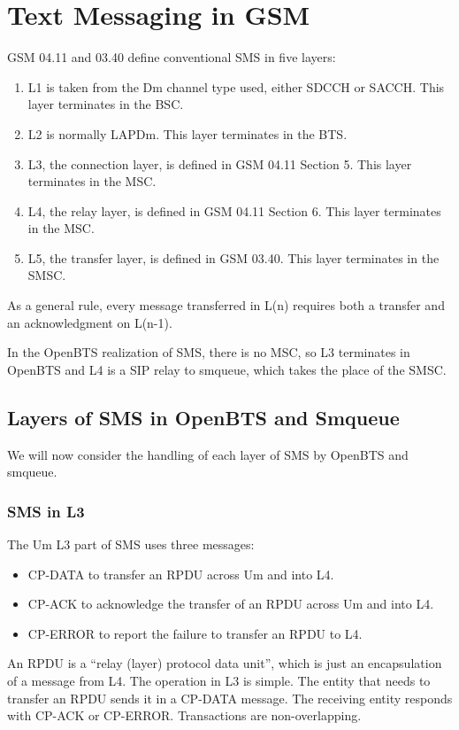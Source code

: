 \documentclass[11pt,openany]{book}
\begin{document}
\section{Text Messaging in GSM}
GSM 04.11 and 03.40 define conventional SMS in five layers:
\begin{enumerate}
	\item L1 is taken from the Dm channel type used, either SDCCH or SACCH. This layer terminates in the BSC.
	\item L2 is normally LAPDm. This layer terminates in the BTS.
	\item L3, the connection layer, is defined in GSM 04.11 Section 5. This layer terminates in the MSC.
	\item L4, the relay layer, is defined in GSM 04.11 Section 6. This layer terminates in the MSC.
	\item L5, the transfer layer, is defined in GSM 03.40. This layer terminates in the SMSC.
\end{enumerate}
As a general rule, every message transferred in L(n) requires both a transfer and an acknowledgment on L(n-1).

In the OpenBTS realization of SMS, there is no MSC, so L3 terminates in OpenBTS and L4 is a SIP relay to smqueue, which takes the place of the SMSC.

\subsection{Layers of SMS in OpenBTS and Smqueue}
We will now consider the handling of each layer of SMS by OpenBTS and smqueue.

\subsubsection{SMS in L3}
The Um L3 part of SMS uses three messages:
\begin{itemize}
	\item CP-DATA to transfer an RPDU across Um and into L4.
	\item CP-ACK to acknowledge the transfer of an RPDU across Um and into L4.
	\item CP-ERROR to report the failure to transfer an RPDU to L4.
\end{itemize}
An RPDU is a ``relay (layer) protocol data unit'', which is just an encapsulation of a message from L4.
The operation in L3 is simple.  The entity that needs to transfer an RPDU sends it in a CP-DATA message.  The receiving entity responds with CP-ACK or CP-ERROR.  Transactions are non-overlapping.
\end{document}
